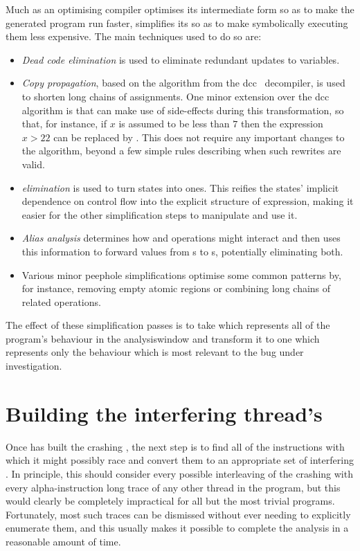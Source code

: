 Much as an optimising compiler optimises its intermediate form so as
to make the generated program run faster, {\technique} simplifies its
{\StateMachines} so as to make symbolically executing them less
expensive.  The main techniques used to do so are:
\begin{itemize}
\item \emph{Dead code elimination} is used to eliminate redundant
  updates to {\StateMachine} variables.
\item \emph{Copy propagation}, based on the algorithm from the
  dcc~\cite{Cifuentes1994} decompiler, is used to shorten long chains
  of assignments.  One minor extension over the dcc algorithm is that
  {\technique} can make use of {\stAssertN} side-effects during this
  transformation, so that, for instance, if $x$ is assumed to be less
  than $7$ then the expression $x > 22$ can be replaced by \false.
  This does not require any important changes to the algorithm, beyond
  a few simple rules describing when such rewrites are valid.
\item \emph{{\stPhi} elimination} is used to turn {\stPhi} states into
   ones.  This reifies the {\stPhi} states' implicit
  dependence on {\StateMachine} control flow into the explicit
  structure of {\AStateMachine} expression, making it easier for the
  other simplification steps to manipulate and use it.
\item \emph{Alias analysis} determines how  and
   operations might interact and then uses this
  information to forward values from s to s,
  potentially eliminating both.
\item Various minor peephole simplifications optimise some common
  {\StateMachine} patterns by, for instance, removing empty atomic
  regions or combining long chains of related  operations.
\end{itemize}
The effect of these simplification passes is to take {\AStateMachine}
which represents all of the program's behaviour in the
\gls{analysiswindow} and transform it to one which represents only the
behaviour which is most relevant to the bug under investigation.

\section{Building the interfering thread's \StateMachines}
\label{sect:derive:write_side}

Once {\technique} has built the crashing {\StateMachine}, the next
step is to find all of the instructions with which it might possibly
race and convert them to an appropriate set of interfering
{\StateMachines}.  In principle, this should consider every possible
interleaving of the crashing {\StateMachine} with every
\gls{alpha}-instruction long trace of any other thread in the program,
but this would clearly be completely impractical for all but the most
trivial programs.  Fortunately, most such traces can be dismissed
without ever needing to explicitly enumerate them, and this usually
makes it possible to complete the analysis in a reasonable amount of
time.

